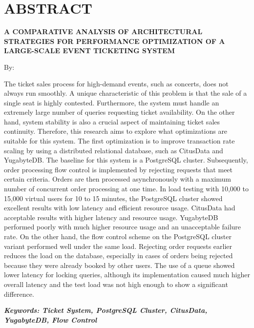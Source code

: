 \clearpage
\chapter*{ABSTRACT}

\begin{center}
    \center
    \begin{singlespace}
        \large\bfseries\MakeUppercase{A Comparative Analysis of Architectural Strategies for Performance Optimization of a Large-Scale Event Ticketing System}

        \normalfont\normalsize
        By:

        \bfseries \theauthor
    \end{singlespace}
\end{center}


\begin{singlespace}
    \small
    The ticket sales process for high-demand events, such as concerts, does not always run smoothly. A unique characteristic of this problem is that the sale of a single seat is highly contested. Furthermore, the system must handle an extremely large number of queries requesting ticket availability. On the other hand, system stability is also a crucial aspect of maintaining ticket sales continuity. Therefore, this research aims to explore what optimizations are suitable for this system. The first optimization is to improve transaction rate scaling by using a distributed relational database, such as CitusData and YugabyteDB. The baseline for this system is a PostgreSQL cluster. Subsequently, order processing flow control is implemented by rejecting requests that meet certain criteria. Orders are then processed asynchronously with a maximum number of concurrent order processing at one time. In load testing with 10,000 to 15,000 virtual users for 10 to 15 minutes, the PostgreSQL cluster showed excellent results with low latency and efficient resource usage. CitusData had acceptable results with higher latency and resource usage. YugabyteDB performed poorly with much higher resource usage and an unacceptable failure rate. On the other hand, the flow control scheme on the PostgreSQL cluster variant performed well under the same load. Rejecting order requests earlier reduces the load on the database, especially in cases of orders being rejected because they were already booked by other users. The use of a queue showed lower latency for locking queries, although its implementation caused much higher overall latency and the test load was not high enough to show a significant difference.

    \textbf{\textit{Keywords: Ticket System, PostgreSQL Cluster, CitusData, YugabyteDB, Flow Control}}
\end{singlespace}
\clearpage

\clearpage